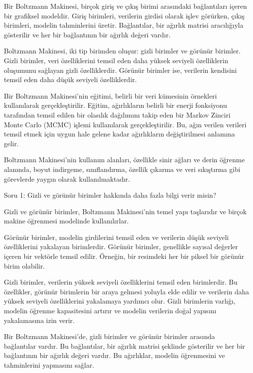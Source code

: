 \documentclass[11pt]{article}
\begin{document}
Bir Boltzmann Makinesi, birçok giriş ve çıkış birimi arasındaki bağlantıları içeren bir grafiksel modeldir. Giriş birimleri, verilerin girdisi olarak işlev görürken, çıkış birimleri, modelin tahminlerini üretir. Bağlantılar, bir ağırlık matrisi aracılığıyla gösterilir ve her bir bağlantının bir ağırlık değeri vardır.

Boltzmann Makinesi, iki tip birimden oluşur: gizli birimler ve görünür birimler. Gizli birimler, veri özelliklerini temsil eden daha yüksek seviyeli özelliklerin oluşumunu sağlayan gizli özelliklerdir. Görünür birimler ise, verilerin kendisini temsil eden daha düşük seviyeli özelliklerdir.

Bir Boltzmann Makinesi'nin eğitimi, belirli bir veri kümesinin örnekleri kullanılarak gerçekleştirilir. Eğitim, ağırlıkların belirli bir enerji fonksiyonu tarafından temsil edilen bir olasılık dağılımını takip eden bir Markov Zinciri Monte Carlo (MCMC) işlemi kullanılarak gerçekleştirilir. Bu, ağın verilen verileri temsil etmek için uygun hale gelene kadar ağırlıkların değiştirilmesi anlamına gelir.

Boltzmann Makinesi'nin kullanım alanları, özellikle sinir ağları ve derin öğrenme alanında, boyut indirgeme, sınıflandırma, özellik çıkarma ve veri sıkıştırma gibi görevlerde yaygın olarak kullanılmaktadır.

Soru 1: Gizli ve görünür birimler hakkında daha fazla bilgi verir misin?

Gizli ve görünür birimler, Boltzmann Makinesi'nin temel yapı taşlarıdır ve birçok makine öğrenmesi modelinde kullanılırlar.

Görünür birimler, modelin girdilerini temsil eden ve verilerin düşük seviyeli özelliklerini yakalayan birimlerdir. Görünür birimler, genellikle sayısal değerler içeren bir vektörle temsil edilir. Örneğin, bir resimdeki her bir piksel bir görünür birim olabilir.

Gizli birimler, verilerin yüksek seviyeli özelliklerini temsil eden birimlerdir. Bu özellikler, görünür birimlerin bir araya gelmesi yoluyla elde edilir ve verilerin daha yüksek seviyeli özelliklerini yakalamaya yardımcı olur. Gizli birimlerin varlığı, modelin öğrenme kapasitesini artırır ve modelin verilerin doğal yapısını yakalamasına izin verir.

Bir Boltzmann Makinesi'de, gizli birimler ve görünür birimler arasında bağlantılar vardır. Bu bağlantılar, bir ağırlık matrisi şeklinde gösterilir ve her bir bağlantının bir ağırlık değeri vardır. Bu ağırlıklar, modelin öğrenmesini ve tahminlerini yapmasını sağlar.
\end{document}

